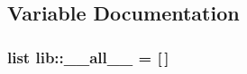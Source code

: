 \subsection{\-Variable \-Documentation}
\hypertarget{namespacelib_aea9928ff3917bdb79279987499bb64bb}{
\subsubsection[{\-\_\-\-\_\-all\-\_\-\-\_\-}]{\setlength{\rightskip}{0pt plus 5cm}list {\bf lib\-::\-\_\-\-\_\-all\-\_\-\-\_\-} = \mbox{[}$\,$\mbox{]}}}\label{namespacelib_aea9928ff3917bdb79279987499bb64bb}
